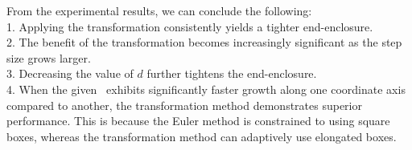 	From the experimental results, we can conclude the following:  
	\\ 1. Applying the transformation consistently yields a tighter
	end-enclosure.  
	\\ 2. The benefit of the transformation becomes increasingly
	significant as the step size grows larger.  
	\\ 3. Decreasing the value of $d$ further tightens the end-enclosure.  
	\\ 4. When the given \ivp\ exhibits significantly faster growth along
	one coordinate axis compared to another, the transformation method
	demonstrates superior performance. This is because the Euler method is
	constrained to using square boxes, whereas the transformation method
	can adaptively use elongated boxes.  


